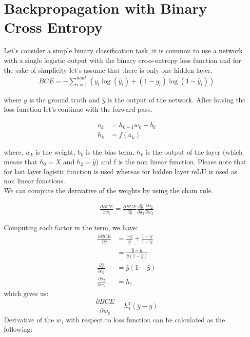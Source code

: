\documentclass[
]{article}
\author{}
\date{\vspace{-2.5em}}
\begin{document}
\startappendices

\hypertarget{chap:appendix_a}{%
\section{Backpropagation with Binary Cross
Entropy}\label{chap:appendix_a}}

Let's consider a simple binary classification task, it is common to use
a network with a single logistic output with the binary cross-entropy
loss function and for the sake of simplicity let's assume that there is
only one hidden layer. \[
\begin{aligned}
BCE=-\sum_{i=1}^{n o u t}\left(y_i \log \left(\hat{y}_i \right)+\left(1-y_i\right) \log \left(1-\hat{y}_i\right)\right)
\end{aligned}
\]

where \(y\) is the ground truth and \(\hat{y}\) is the output of the
network. After having the loss function let's continue with the forward
pass.

\[
\begin{aligned} 
a_{k} &= h_{k-1} w_{k} + b_k \\
h_k &= f(a_{k})
\end{aligned}
\]

where, \(w_k\) is the weight, \(b_{k}\) is the bias term, \(h_k\) is the
output of the layer (which means that \(h_0 = X\) and \(h_2 = \hat{y}\))
and f is the non linear function. Please note that for last layer
logistic function is used whereas for hidden layer reLU is used as non
linear functions.\\
We can compute the derivative of the weights by using the chain rule.

\[
\begin{aligned} 
\frac{\partial BCE}{\partial w_{2}}=\frac{\partial BCE}{\partial \hat{y}} \frac{\partial \hat{y}}{\partial a_{2}} \frac{\partial a_{2}}{\partial w_{2}}
\end{aligned}
\]

Computing each factor in the term, we have: \[
\begin{aligned}
\frac{\partial BCE}{\partial \hat{y}} &=\frac{-y}{\hat{y}}+\frac{1-y}{1-\hat{y}} \\
&=\frac{\hat{y}-y}{\hat{y}\left(1-\hat{y}\right)} \\
\frac{\partial \hat{y}}{\partial a_{2}} &=\hat{y}\left(1-\hat{y}\right) \\
\frac{\partial a_{2}}{\partial w_{2}} &=h_{1}
\end{aligned}
\] which gives us: \[
\frac{\partial BCE}{\partial w_{2}}=h_{1}^T\left(\hat{y}-y\right)
\] Derivative of the \(w_1\) with respect to loss function can be
calculated as the following:
\end{document}
